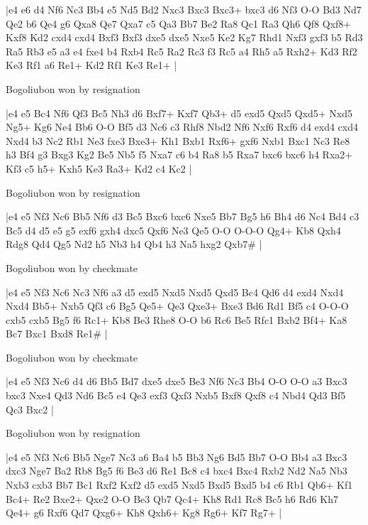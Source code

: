 \makegametitle
|e4 e6 d4 Nf6 Nc3 Bb4 e5 Nd5 Bd2 Nxc3 Bxc3 Bxc3+ bxc3 d6 Nf3 O-O Bd3 Nd7 Qe2 b6 Qe4 g6 Qxa8 Qe7 Qxa7 c5 Qa3 Bb7 Be2 Ra8 Qc1 Ra3 Qh6 Qf8 Qxf8+ Kxf8 Kd2 cxd4 cxd4 Bxf3 Bxf3 dxe5 dxe5 Nxe5 Ke2 Kg7 Rhd1 Nxf3 gxf3 b5 Rd3 Ra5 Rb3 e5 a3 e4 fxe4 b4 Rxb4 Rc5 Ra2 Rc3 f3 Rc5 a4 Rh5 a5 Rxh2+ Kd3 Rf2 Ke3 Rf1 a6 Re1+ Kd2 Rf1 Ke3 Re1+  |

\showboard

Bogoliubon won by resignation

\makegametitle
|e4 e5 Bc4 Nf6 Qf3 Bc5 Nh3 d6 Bxf7+ Kxf7 Qb3+ d5 exd5 Qxd5 Qxd5+ Nxd5 Ng5+ Kg6 Ne4 Bb6 O-O Bf5 d3 Nc6 c3 Rhf8 Nbd2 Nf6 Nxf6 Rxf6 d4 exd4 cxd4 Nxd4 b3 Nc2 Rb1 Ne3 fxe3 Bxe3+ Kh1 Bxb1 Rxf6+ gxf6 Nxb1 Bxc1 Nc3 Re8 h3 Bf4 g3 Bxg3 Kg2 Be5 Nb5 f5 Nxa7 c6 b4 Ra8 b5 Rxa7 bxc6 bxc6 h4 Rxa2+ Kf3 c5 h5+ Kxh5 Ke3 Ra3+ Kd2 c4 Kc2  |

\showboard

Bogoliubon won by resignation

\makegametitle
|e4 e5 Nf3 Nc6 Bb5 Nf6 d3 Bc5 Bxc6 bxc6 Nxe5 Bb7 Bg5 h6 Bh4 d6 Nc4 Bd4 c3 Bc5 d4 d5 e5 g5 exf6 gxh4 dxc5 Qxf6 Ne3 Qe5 O-O O-O-O Qg4+ Kb8 Qxh4 Rdg8 Qd4 Qg5 Nd2 h5 Nb3 h4 Qb4 h3 Na5 hxg2 Qxb7\#  |

\showboard

Bogoliubon won by checkmate

\makegametitle
|e4 e5 Nf3 Nc6 Nc3 Nf6 a3 d5 exd5 Nxd5 Nxd5 Qxd5 Bc4 Qd6 d4 exd4 Nxd4 Nxd4 Bb5+ Nxb5 Qf3 c6 Bg5 Qe5+ Qe3 Qxe3+ Bxe3 Bd6 Rd1 Bf5 c4 O-O-O cxb5 cxb5 Bg5 f6 Rc1+ Kb8 Be3 Rhe8 O-O b6 Rc6 Be5 Rfc1 Bxb2 Bf4+ Ka8 Bc7 Bxc1 Bxd8 Re1\#  |

\showboard

Bogoliubon won by checkmate

\makegametitle
|e4 e5 Nf3 Nc6 d4 d6 Bb5 Bd7 dxe5 dxe5 Be3 Nf6 Nc3 Bb4 O-O O-O a3 Bxc3 bxc3 Nxe4 Qd3 Nd6 Bc5 e4 Qe3 exf3 Qxf3 Nxb5 Bxf8 Qxf8 c4 Nbd4 Qd3 Bf5 Qc3 Bxc2  |

\showboard

Bogoliubon won by resignation

\makegametitle
|e4 e5 Nf3 Nc6 Bb5 Nge7 Nc3 a6 Ba4 b5 Bb3 Ng6 Bd5 Bb7 O-O Bb4 a3 Bxc3 dxc3 Nge7 Ba2 Rb8 Bg5 f6 Be3 d6 Re1 Bc8 c4 bxc4 Bxc4 Rxb2 Nd2 Na5 Nb3 Nxb3 cxb3 Bb7 Bc1 Rxf2 Kxf2 d5 exd5 Nxd5 Bxd5 Bxd5 b4 c6 Rb1 Qb6+ Kf1 Bc4+ Re2 Bxe2+ Qxe2 O-O Be3 Qb7 Qc4+ Kh8 Rd1 Rc8 Bc5 h6 Rd6 Kh7 Qe4+ g6 Rxf6 Qd7 Qxg6+ Kh8 Qxh6+ Kg8 Rg6+ Kf7 Rg7+  |


